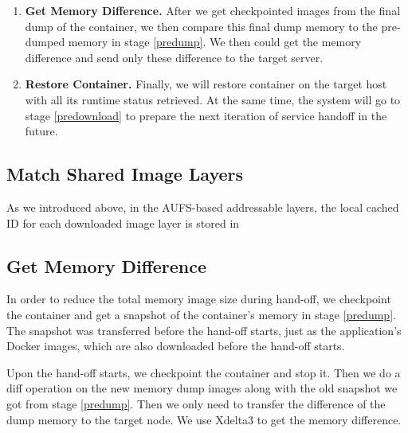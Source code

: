 \begin{enumerate}[label=\textbf{S\arabic*}]
\item \label{img-sync} \textbf{Get Memory Difference.} After we get checkpointed images from the final dump of the container, we then compare this final dump memory to the pre-dumped memory in stage \ref{predump}. We then could get the memory difference and send only these difference to the target server. 

\item \label{restore} \textbf{Restore Container.} Finally, we will restore container on the target host with all its runtime status retrieved. At the same time, the system will go to stage \ref{predownload} to prepare the next iteration of service handoff in the future.

\end{enumerate}


 
\subsection{Match Shared Image Layers} \label{design:mapImage}

As we introduced above, in the AUFS-based addressable layers, the local cached ID for each downloaded image layer is stored in 

\subsection{Get Memory Difference} \label{design:memDiff}
In order to reduce the total memory image size during hand-off, we checkpoint the container and get a snapshot of the container's memory in stage \ref{predump}. The snapshot was transferred before the hand-off starts, just as the application's Docker images, which are also downloaded before the hand-off starts.

Upon the hand-off starts, we checkpoint the container and stop it. Then we do a diff operation on the new memory dump images along with the old snapshot we got from stage \ref{predump}. Then we only need to transfer the difference of the dump memory to the target node. We use Xdelta3 to get the memory difference.



